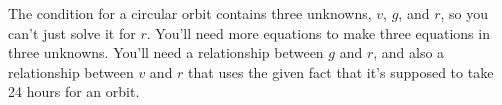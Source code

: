 The condition for a circular orbit
contains three unknowns, $v$, $g$, and $r$, so you can't just solve it for $r$. You'll need
more equations to make three equations in three unknowns. You'll need a relationship
between $g$ and $r$, and also a relationship between $v$ and $r$ that uses the
given fact that it's supposed to take 24 hours for an orbit.
